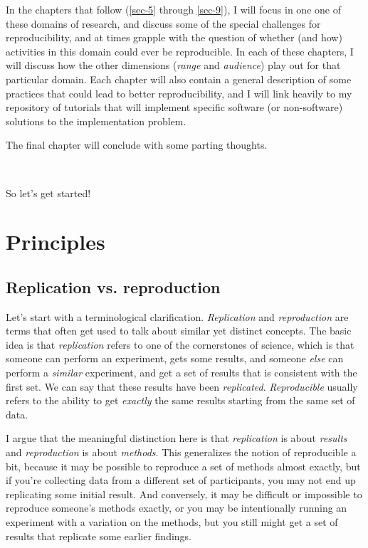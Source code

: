 \documentclass{book}
\begin{document}
In the chapters that follow (\ref{sec-5} through \ref{sec-9}), I will focus in one one of these domains of research, and discuss some of the special challenges for reproducibility, and at times grapple with the question of whether (and how) activities in this domain could ever be reproducible. In each of these chapters, I will discuss how the other dimensions (\emph{range} and \emph{audience}) play out for that particular domain. Each chapter will also contain a general description of some practices that could lead to better reproducibility, and I will link heavily to my repository of tutorials that will implement specific software (or non-software) solutions to the implementation problem.

The final chapter will conclude with some parting thoughts.

~

So let's get started!
\chapter{Principles}
\label{sec-2}
\label{principles}
\section{Replication vs. reproduction}
\label{sec-2-1}

Let's start with a terminological clarification.  \emph{Replication} and \emph{reproduction} are terms that often get used to talk about similar yet distinct concepts.  The basic idea is that \emph{replication} refers to one of the cornerstones of science, which is that someone can perform an experiment, gets some results, and someone \emph{else} can perform a \emph{similar} experiment, and get a set of results that is consistent with the first set. We can say that these results have been \emph{replicated}.  \emph{Reproducible} usually refers to the ability to get \emph{exactly} the same results starting from the same set of data.

I argue that the meaningful distinction here is that \emph{replication} is about \emph{results} and \emph{reproduction} is about \emph{methods}.  This generalizes the notion of reproducible a bit, because it may be possible to reproduce a set of methods almost exactly, but if you're collecting data from a different set of participants, you may not end up replicating some initial result.  And conversely, it may be difficult or impossible to reproduce someone's methods exactly, or you may be intentionally running an experiment with a variation on the methods, but you still might get a set of results that replicate some earlier findings.
\end{document}
